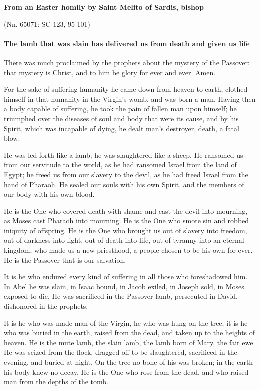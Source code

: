 \textbf{From an Easter homily by Saint Melito of Sardis, bishop}

\par \hfill(Nn. 65071: SC 123, 95-101)

\paragraph{The lamb that was slain has delivered us from death and given us life}

There was much proclaimed by the prophets about the mystery of the Passover: that mystery is Christ, and to him be glory for ever and ever. Amen.

For the sake of suffering humanity he came down from heaven to earth, clothed himself in that humanity in the Virgin’s womb, and was born a man. Having then a body capable of suffering, he took the pain of fallen man upon himself; he triumphed over the diseases of soul and body that were its cause, and by his Spirit, which was incapable of dying, he dealt man’s destroyer, death, a fatal blow.

He was led forth like a lamb; he was slaughtered like a sheep. He ransomed us from our servitude to the world, as he had ransomed Israel from the land of Egypt; he freed us from our slavery to the devil, as he had freed Israel from the hand of Pharaoh. He sealed our souls with his own Spirit, and the members of our body with his own blood.

He is the One who covered death with shame and cast the devil into mourning, as Moses cast Pharaoh into mourning. He is the One who smote sin and robbed iniquity of offspring. He is the One who brought us out of slavery into freedom, out of darkness into light, out of death into life, out of tyranny into an eternal kingdom; who made us a new priesthood, a people chosen to be his own for ever. He is the Passover that is our salvation.

It is he who endured every kind of suffering in all those who foreshadowed him. In Abel he was slain, in Isaac bound, in Jacob exiled, in Joseph sold, in Moses exposed to die. He was sacrificed in the Passover lamb, persecuted in David, dishonored in the prophets.

It is he who was made man of the Virgin, he who was hung on the tree; it is he who was buried in the earth, raised from the dead, and taken up to the heights of heaven. He is the mute lamb, the slain lamb, the lamb born of Mary, the fair ewe. He was seized from the flock, dragged off to be slaughtered, sacrificed in the evening, and buried at night. On the tree no bone of his was broken; in the earth his body knew no decay. He is the One who rose from the dead, and who raised man from the depths of the tomb.

